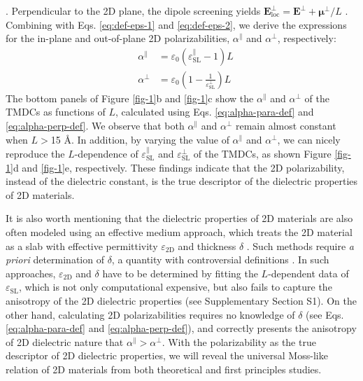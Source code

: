 \documentclass[journal=ancac3,manuscript=article,email=true,hyperref=true,keywords=false]{achemso}
\begin{document}
\cite{Markel_2016}. Perpendicular to the 2D plane, the dipole
screening yields
$\boldsymbol{E}_{\mathrm{loc}}^{\perp}=\boldsymbol{E}^{\perp}+\boldsymbol{\mu}^{\perp}/L$
\cite{Meyer_2001_dipole_slab,T_bik_2004}. Combining with
Eqs. \ref{eq:def-eps-1} and \ref{eq:def-eps-2}, we derive the
expressions for the in-plane and out-of-plane 2D polarizabilities,
$\alpha^{\parallel}$ and $\alpha^{\perp}$, respectively:
\begin{subequations}
\begin{eqnarray}
  \label{eq:alpha-para-def}
  &\alpha^{\parallel} &= \varepsilon_{0}(\varepsilon_{\mathrm{SL}}^{\parallel} - 1)L\\
  \label{eq:alpha-perp-def}
    &\alpha^{\perp} &= \varepsilon_{0}\left(1 - {\displaystyle \frac{1}{\varepsilon_{\mathrm{SL}}^{\perp}}}\right)L
\end{eqnarray}
\end{subequations}
The bottom panels of Figure \ref{fig-1}b and \ref{fig-1}c show the
$\alpha^{\parallel}$ and $\alpha^{\perp}$ of the TMDCs as functions of
$L$, calculated using Eqs. \ref{eq:alpha-para-def} and
\ref{eq:alpha-perp-def}. We observe that both $\alpha^{\parallel}$ and
$\alpha^{\perp}$ remain almost constant when $L>$15 \AA{}. In
addition, by varying the value of $\alpha^{\parallel}$ and
$\alpha^{\perp}$, we can nicely reproduce the $L$-dependence of
$\varepsilon_{\mathrm{SL}}^{\parallel}$ and
$\varepsilon_{\mathrm{SL}}^{\perp}$ of the TMDCs, as shown Figure \ref{fig-1}d
and \ref{fig-1}e, respectively. These findings indicate that the 2D polarizability,
instead of the dielectric constant, is the true descriptor of the
dielectric properties of 2D materials.

It is also worth mentioning that the dielectric properties of 2D
materials are also often modeled using an effective medium approach,
which treats the 2D material as a slab with effective permittivity
$\varepsilon_{\mathrm{2D}}$ and thickness $\delta$
\cite{Sharma_1985,Cudazzo_2011_screening_2D,Matthes_2016,Trolle_2017_eps_subst,Laturia_2018}. Such
methods require \textit{a priori} determination of $\delta$, a
quantity with controversial definitions \cite{Mas_Ballest__2011}. In
such approaches, $\varepsilon_{\mathrm{2D}}$ and $\delta$ have to be
determined by fitting the $L$-dependent data of
$\varepsilon_{\mathrm{SL}}$, which is not only computational
expensive, but also fails to capture the anisotropy of the 2D
dielectric properties (see Supplementary Section S1). On the other
hand, calculating 2D polarizabilities requires no knowledge of
$\delta$ (see Eqs. \ref{eq:alpha-para-def} and
\ref{eq:alpha-perp-def}), and correctly presents the anisotropy of 2D
dielectric nature that $\alpha^{\parallel} > \alpha^{\perp}$.  With
the polarizability as the true descriptor of 2D dielectric properties,
we will reveal the universal Moss-like relation of 2D materials from
both theoretical and first principles studies.
\end{document}
